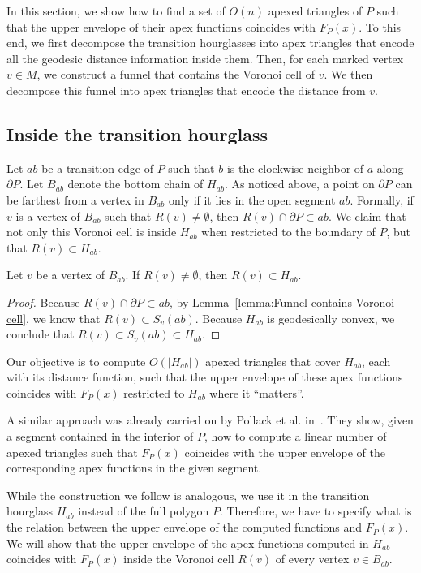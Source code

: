 \documentclass[a4paper,UKenglish]{lipics}
\newcommand{\F}[2]{\ensuremath{F_{\scriptscriptstyle #1}(#2)}}
\newcommand{\fn}[2]{\ensuremath{S_{\scriptscriptstyle #1}(#2)}}
\begin{document}
In this section, we show how to find a set of $O(n)$ apexed triangles of $P$ such that the upper envelope of their apex functions coincides with $\F{P}{x}$.
To this end, we first decompose the transition hourglasses into apex triangles that encode all the geodesic distance information inside them. Then, for each marked vertex $v\in M$, we construct a funnel that contains the Voronoi cell of $v$.  We then decompose this funnel into apex triangles that encode the distance from $v$.

\subsection{Inside the transition hourglass}
Let $ab$ be a transition edge of $P$  such that $b$ is the clockwise neighbor of $a$ along $\partial P$.
Let $B_{ab}$ denote the bottom chain of $H_{ab}$.
As noticed above, a point on $\partial P$ can be farthest from a vertex in $B_{ab}$ only if it lies in the open segment $ab$.
Formally, if $v$ is a vertex of $B_{ab}$ such that $R(v)\neq \emptyset$, then $R(v)\cap \partial P \subset ab$.
We claim that not only this Voronoi cell is inside $H_{ab}$ when restricted to the boundary of $P$, but that $R(v)\subset H_{ab}$. 

\begin{lemma}\label{lemma:Cell contained in geodesic triangle}
Let $v$ be a vertex of $B_{ab}$. If $R(v)\neq \emptyset$, then $R(v) \subset H_{ab}$.
\end{lemma}
\begin{proof}
Because $R(v)\cap \partial P \subset ab$, by Lemma~\ref{lemma:Funnel contains Voronoi cell}, we know that $R(v)\subset \fn{v}{ab}$. Because $H_{ab}$ is geodesically convex, we conclude that $R(v)\subset \fn{v}{ab}\subset H_{ab}$.
\end{proof}


Our objective is to compute $O(|H_{ab}|)$ apexed triangles that cover $H_{ab}$, each with its distance function, such that the upper envelope of these apex functions coincides with $\F{P}{x}$ restricted to $H_{ab}$ where it ``matters''.

A similar approach was already carried on by Pollack et al. in~\cite[Section 3]{pollackComputingCenter}. 
They show, given a segment contained in the interior of $P$, 
how to compute a linear number of apexed triangles such that $\F{P}{x}$ coincides with the upper envelope of the corresponding apex functions in the given segment.

While the construction we follow is analogous, we use it in the transition hourglass $H_{ab}$ instead of the full polygon $P$. 
Therefore, we have to specify what is the relation between the upper envelope of the computed functions and $\F{P}{x}$. 
We will show that the upper envelope of the apex functions computed in $H_{ab}$ coincides with $\F{P}{x}$ inside the Voronoi cell $R(v)$ of every vertex $v\in B_{ab}$.
\end{document}
